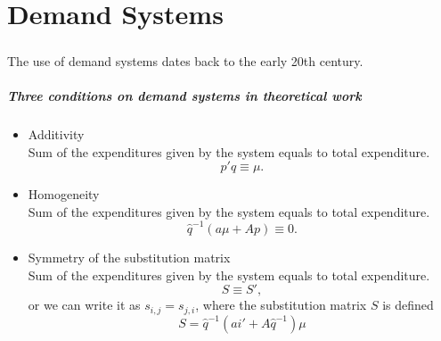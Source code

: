 \chapter{Demand Systems}\label{chp:Demand_Systems}




\paragraph{}{The use of demand systems dates back to the early 20th century. }

\paragraph{Three conditions on demand systems in theoretical work\\}{
	\begin{itemize}
		\item Additivity\\
		Sum of the expenditures given by the system equals to total expenditure. 
			\begin{equation}\label{eq2.0.1a}
				p'q \equiv \mu.
			\end{equation}
		
		\item Homogeneity\\
		Sum of the expenditures given by the system equals to total expenditure. 
			\begin{equation}\label{eq2.0.1b}
				\hat{q}^{-1}(a \mu + Ap) \equiv 0.
			\end{equation}
	
		\item Symmetry of the substitution matrix\\
		Sum of the expenditures given by the system equals to total expenditure. 
			\begin{equation}\label{eq2.0.1c}
				S \equiv S',
			\end{equation}
		or we can write it as $s_{i,j}=s_{j,i}$, where the substitution matrix $S$ is defined
			\begin{equation}\label{eq2.0.1d}
				S=\hat{q}^{-1}(ai' + A\hat{q}^{-1})\mu
			\end{equation}
		
	\end{itemize}
}

